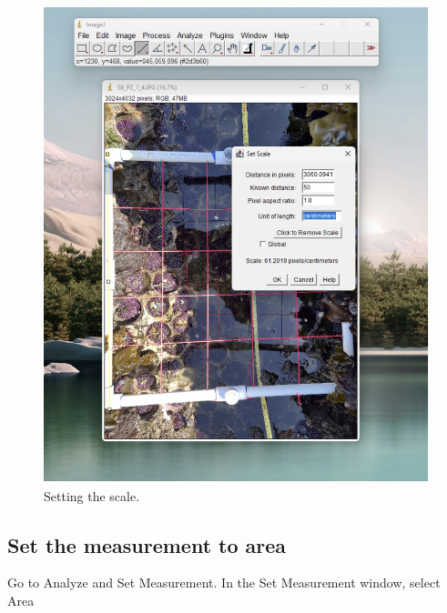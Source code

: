 \documentclass[12pt,letterpaper]{article}
\begin{document}
\begin{figure}[H]
	\centering
	\includegraphics[width=1\linewidth]{figs/SetMeasurement.png}
	\caption{Setting the scale.}
	\label{fig:logo}
\end{figure}


\subsection{Set the measurement to area}

Go to Analyze and Set Measurement. In the Set Measurement window, select Area
\end{document}
